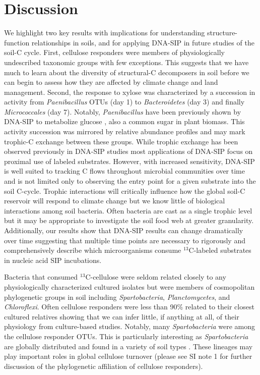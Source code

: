 \section{Discussion} 
We highlight two key results with implications for understanding structure-function
relationships in soils, and for applying DNA-SIP in future studies of the soil-C
cycle. First, cellulose responders were members of physiologically undescribed
taxonomic groups with few exceptions. This suggests that we have much to learn
about the diversity of structural-C decomposers in soil before we can begin to
assess how they are affected by climate change and land management. Second, the
response to xylose was characterized by a succession in activity from
\textit{Paenibacillus} OTUs (day 1) to \textit{Bacteroidetes} (day 3) and finally
\textit{Micrococcales} (day 7). Notably,  \textit{Paenibacillus} have been
previously shown by DNA-SIP to metabolize glucose \citep{Verastegui_2014}, also a common 
sugar in plant biomass. This activity succession was mirrored
by relative abundance profiles and may mark trophic-C exchange between these
groups. While trophic exchange has been observed previously in DNA-SIP studies
\citep{lueders2004b} most applications of DNA-SIP focus on proximal use of
labeled substrates. However, with increased sensitivity, DNA-SIP is well suited
to tracking C flows throughout microbial communities over time and is not
limited only to observing the entry point for a given substrate into the soil
C-cycle.  Trophic interactions will critically influence how the global soil-C
reservoir will respond to climate change \citep{Crowther2015} but we know
little of biological interactions among soil bacteria. Often bacteria are cast
as a single trophic level \citep{Moore1988} but it may be appropriate to
investigate the soil food web at greater granularity. Additionally, our results
show that DNA-SIP results can change dramatically over time suggesting that
multiple time points are necessary to rigorously and comprehensively describe
which microorganisms consume $^{13}$C-labeled substrates in nucleic acid SIP
incubations.

Bacteria that consumed $^{13}$C-cellulose were seldom related closely to any
physiologically characterized cultured isolates but were members of
cosmopolitan phylogenetic groups in soil including \textit{Spartobacteria},
\textit{Planctomycetes}, and \textit{Chloroflexi}. Often cellulose responders
were less than 90\% related to their closest cultured relatives showing that we
can infer little, if anything at all, of their physiology from culture-based
studies. Notably, many \textit{Spartobacteria} were among the cellulose responder OTUs.
This is particularly interesting as \textit{Spartobacteria} are globally
distributed and found in a variety of soil types \citep{Bergmann_2011}. These lineages may play
important roles in global cellulose turnover (please see SI note 1 for further
discussion of the phylogenetic affiliation of cellulose responders). 

